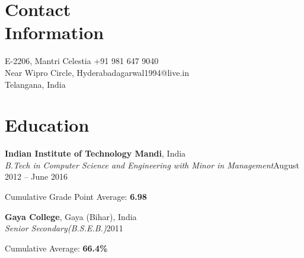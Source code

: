 \documentclass[a4paper,margin,line]{resume}
\begin{document}
\begin{resume}

	\section{\mysidestyle Contact\\Information}

	E-2206, Mantri Celestia \hfill +91 981 647 9040\\%
	Near Wipro Circle, Hyderabad\hfill agarwal1994@live.in\\%
	Telangana, India\hfill %



	\section{\mysidestyle Education}

	\textbf{Indian Institute of Technology Mandi}, India\\%
	\textsl{B.Tech in Computer Science and Engineering with Minor in Management}\hfill August 2012 -- June 2016\vspace{-3mm}\\%
	\begin{list2}%
		\item Cumulative Grade Point Average: \textbf{6.98}%
	\end{list2}

	\textbf{Gaya College}, Gaya (Bihar), India\\%
	\textsl{Senior Secondary(B.S.E.B.)}\hfill 2011\vspace{-3mm}\\%
	\begin{list2}%
		\item Cumulative Average: \textbf{66.4\%}%


\end{list2}
\end{resume}
\end{document}
